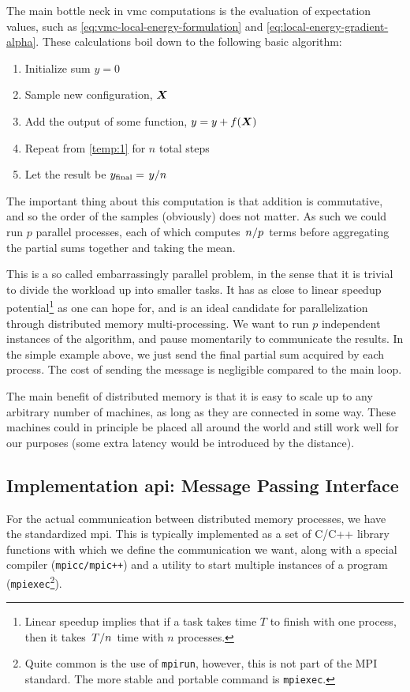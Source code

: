 \documentclass[Thesis.tex]{subfiles}
\begin{document}
The main bottle neck in \gls{vmc} computations is the evaluation of expectation
values, such as \cref{eq:vmc-local-energy-formulation} and
\cref{eq:local-energy-gradient-alpha}. These calculations boil down to the
following basic algorithm:

\begin{enumerate}
\item Initialize sum $y = 0$
\item Sample new configuration, $\bm{X}$\label{temp:1}
\item Add the output of some function, $y = y + f(\bm{X})$
\item Repeat from \ref{temp:1} for $n$ total steps
\item Let the result be $y_\text{final} = \flatfrac{y}{n}$
\end{enumerate}
The important thing about this computation is that addition is commutative, and
so the order of the samples (obviously) does not matter. As such we could run
$p$ parallel processes, each of which computes $\flatfrac{n}{p}$ terms before aggregating
the partial sums together and taking the mean.

This is a so called embarrassingly parallel problem, in the sense that it is
trivial to divide the workload up into smaller tasks. It has as close to linear
speedup potential\footnote{Linear speedup implies that if a task takes time $T$
to finish with one process, then it takes $\flatfrac{T}{n}$ time with $n$
processes.} as one can hope for, and is an ideal candidate for parallelization
through distributed memory multi-processing. We want to run $p$ independent
instances of the algorithm, and pause momentarily to communicate the results. In
the simple example above, we just send the final partial sum acquired by each
process. The cost of sending the message is negligible compared to the main
loop.

The main benefit of distributed memory is that it is easy to scale up to any
arbitrary number of machines, as long as they are connected in some way. These
machines could in principle be placed all around the world and still work well
for our purposes (some extra latency would be introduced by the distance).

\subsection{Implementation \acrshort{api}: Message Passing Interface}

For the actual communication between distributed memory processes, we have the
standardized \gls{mpi}. This is typically implemented as a
set of C/C++ library functions with which we define the communication we want,
along with a special compiler (\texttt{mpicc/mpic++}) and a utility to start
multiple instances of a program (\texttt{mpiexec}\footnote{Quite common is the
  use of \texttt{mpirun}, however, this is not part of the MPI standard. The
  more stable and portable command is \texttt{mpiexec}.}).
\end{document}
